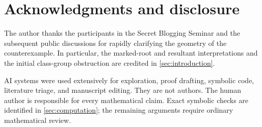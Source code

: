 \documentclass[11pt,reqno]{amsart}
\begin{document}
\section*{Acknowledgments and disclosure}

The author thanks the participants in the Secret Blogging Seminar and the
subsequent public discussions for rapidly clarifying the geometry of the
counterexample.  In particular, the marked-root and resultant
interpretations and the initial class-group obstruction are credited in
\cref{sec:introduction}.

AI systems were used extensively for exploration, proof drafting, symbolic
code, literature triage, and manuscript editing.  They are not authors.  The
human author is responsible for every mathematical claim.  Exact symbolic
checks are identified in \cref{sec:computation}; the remaining arguments
require ordinary mathematical review.



\end{document}
